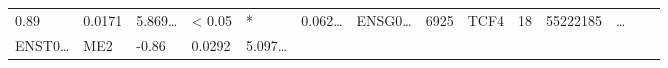\documentclass[
]{article}
\begin{document}
\begin{longtable}[]{@{}llllllllllllll@{}}
\begin{minipage}[t]{0.04\columnwidth}
0.89\strut
\end{minipage} & \begin{minipage}[t]{0.04\columnwidth}\raggedright
0.0171\strut
\end{minipage} & \begin{minipage}[t]{0.05\columnwidth}\raggedright
5.869\ldots{}\strut
\end{minipage} & \begin{minipage}[t]{0.05\columnwidth}\raggedright
\textless{} 0.05\strut
\end{minipage} & \begin{minipage}[t]{0.03\columnwidth}\raggedright
*\strut
\end{minipage} & \begin{minipage}[t]{0.05\columnwidth}\raggedright
0.062\ldots{}\strut
\end{minipage} & \begin{minipage}[t]{0.05\columnwidth}\raggedright
ENSG0\ldots{}\strut
\end{minipage} & \begin{minipage}[t]{0.05\columnwidth}\raggedright
6925\strut
\end{minipage} & \begin{minipage}[t]{0.05\columnwidth}\raggedright
TCF4\strut
\end{minipage} & \begin{minipage}[t]{0.05\columnwidth}\raggedright
18\strut
\end{minipage} & \begin{minipage}[t]{0.05\columnwidth}\raggedright
55222185\strut
\end{minipage} & \begin{minipage}[t]{0.02\columnwidth}\raggedright
\ldots{}\strut
\end{minipage}\tabularnewline
\begin{minipage}[t]{0.05\columnwidth}\raggedright
ENST0\ldots{}\strut
\end{minipage} & \begin{minipage}[t]{0.04\columnwidth}\raggedright
ME2\strut
\end{minipage} & \begin{minipage}[t]{0.04\columnwidth}\raggedright
-0.86\strut
\end{minipage} & \begin{minipage}[t]{0.04\columnwidth}\raggedright
0.0292\strut
\end{minipage} & \begin{minipage}[t]{0.05\columnwidth}\raggedright
5.097\ldots{}\strut

\end{minipage}
\end{longtable}
\end{document}
